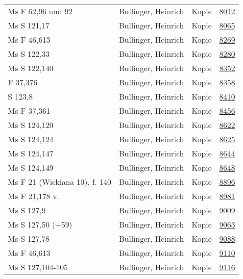 \documentclass[10pt,a4paper,landscape]{report}
\begin{document}
\begin{longtable}{p{16cm}p{4cm}lr}
Ms F 62,96 und 92	&	Bullinger, Heinrich	&	Kopie	&	\href{http://130.60.24.72/assignment/8012}{8012}\\
Ms S 121,17	&	Bullinger, Heinrich	&	Kopie	&	\href{http://130.60.24.72/assignment/8065}{8065}\\
Ms F 46,613	&	Bullinger, Heinrich	&	Kopie	&	\href{http://130.60.24.72/assignment/8269}{8269}\\
Ms S 122,33	&	Bullinger, Heinrich	&	Kopie	&	\href{http://130.60.24.72/assignment/8280}{8280}\\
Ms S 122,140	&	Bullinger, Heinrich	&	Kopie	&	\href{http://130.60.24.72/assignment/8352}{8352}\\
F 37,376	&	Bullinger, Heinrich	&	Kopie	&	\href{http://130.60.24.72/assignment/8358}{8358}\\
S 123,8	&	Bullinger, Heinrich	&	Kopie	&	\href{http://130.60.24.72/assignment/8410}{8410}\\
Ms F 37,361	&	Bullinger, Heinrich	&	Kopie	&	\href{http://130.60.24.72/assignment/8456}{8456}\\
Ms S 124,120	&	Bullinger, Heinrich	&	Kopie	&	\href{http://130.60.24.72/assignment/8622}{8622}\\
Ms S 124,124	&	Bullinger, Heinrich	&	Kopie	&	\href{http://130.60.24.72/assignment/8625}{8625}\\
Ms S 124,147	&	Bullinger, Heinrich	&	Kopie	&	\href{http://130.60.24.72/assignment/8644}{8644}\\
Ms S 124,149	&	Bullinger, Heinrich	&	Kopie	&	\href{http://130.60.24.72/assignment/8648}{8648}\\
Ms F 21 (Wickiana 10), f. 140	&	Bullinger, Heinrich	&	Kopie	&	\href{http://130.60.24.72/assignment/8896}{8896}\\
Ms F 21,178 v.	&	Bullinger, Heinrich	&	Kopie	&	\href{http://130.60.24.72/assignment/8981}{8981}\\
Ms S 127,9	&	Bullinger, Heinrich	&	Kopie	&	\href{http://130.60.24.72/assignment/9009}{9009}\\
Ms S 127,50 (+59)	&	Bullinger, Heinrich	&	Kopie	&	\href{http://130.60.24.72/assignment/9063}{9063}\\
Ms S 127,78	&	Bullinger, Heinrich	&	Kopie	&	\href{http://130.60.24.72/assignment/9088}{9088}\\
Ms F 46,613	&	Bullinger, Heinrich	&	Kopie	&	\href{http://130.60.24.72/assignment/9110}{9110}\\
Ms S 127,104-105	&	Bullinger, Heinrich	&	Kopie	&	\href{http://130.60.24.72/assignment/9116}{9116}\\

\end{longtable}
\end{document}
